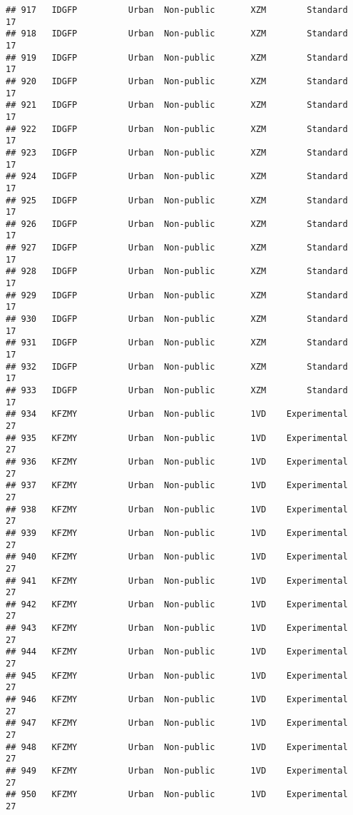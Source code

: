 \documentclass[
]{article}
\begin{document}
\begin{verbatim}
## 917   IDGFP          Urban  Non-public       XZM        Standard        17
## 918   IDGFP          Urban  Non-public       XZM        Standard        17
## 919   IDGFP          Urban  Non-public       XZM        Standard        17
## 920   IDGFP          Urban  Non-public       XZM        Standard        17
## 921   IDGFP          Urban  Non-public       XZM        Standard        17
## 922   IDGFP          Urban  Non-public       XZM        Standard        17
## 923   IDGFP          Urban  Non-public       XZM        Standard        17
## 924   IDGFP          Urban  Non-public       XZM        Standard        17
## 925   IDGFP          Urban  Non-public       XZM        Standard        17
## 926   IDGFP          Urban  Non-public       XZM        Standard        17
## 927   IDGFP          Urban  Non-public       XZM        Standard        17
## 928   IDGFP          Urban  Non-public       XZM        Standard        17
## 929   IDGFP          Urban  Non-public       XZM        Standard        17
## 930   IDGFP          Urban  Non-public       XZM        Standard        17
## 931   IDGFP          Urban  Non-public       XZM        Standard        17
## 932   IDGFP          Urban  Non-public       XZM        Standard        17
## 933   IDGFP          Urban  Non-public       XZM        Standard        17
## 934   KFZMY          Urban  Non-public       1VD    Experimental        27
## 935   KFZMY          Urban  Non-public       1VD    Experimental        27
## 936   KFZMY          Urban  Non-public       1VD    Experimental        27
## 937   KFZMY          Urban  Non-public       1VD    Experimental        27
## 938   KFZMY          Urban  Non-public       1VD    Experimental        27
## 939   KFZMY          Urban  Non-public       1VD    Experimental        27
## 940   KFZMY          Urban  Non-public       1VD    Experimental        27
## 941   KFZMY          Urban  Non-public       1VD    Experimental        27
## 942   KFZMY          Urban  Non-public       1VD    Experimental        27
## 943   KFZMY          Urban  Non-public       1VD    Experimental        27
## 944   KFZMY          Urban  Non-public       1VD    Experimental        27
## 945   KFZMY          Urban  Non-public       1VD    Experimental        27
## 946   KFZMY          Urban  Non-public       1VD    Experimental        27
## 947   KFZMY          Urban  Non-public       1VD    Experimental        27
## 948   KFZMY          Urban  Non-public       1VD    Experimental        27
## 949   KFZMY          Urban  Non-public       1VD    Experimental        27
## 950   KFZMY          Urban  Non-public       1VD    Experimental        27

\end{verbatim}
\end{document}
